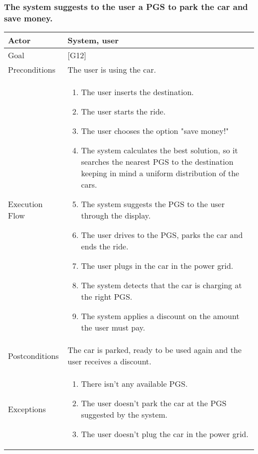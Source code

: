 \documentclass{article}
\begin{document}
	\subsubsection{The system suggests to the user a PGS to park the car and save money.}
	\begin{tabularx}{\textwidth}{  l  X  }
		\hline
		Actor & System, user\\
		\hline
		Goal & [G12]\\
		\hline
		Preconditions & The user is using the car.\\
		\hline
		Execution Flow & \begin{enumerate}
			\item{The user inserts the destination.}
                     \item{The user starts the ride.}
                     \item{The user chooses the option "save money!"}
										 \item{The system calculates the best solution, so it searches the nearest PGS to the destination keeping in mind a uniform distribution of the cars.}
										 \item{The system suggests the PGS to the user through the display.}
										 \item{The user drives to the PGS, parks the car and ends the ride.}
										 \item{The user plugs in the car in the power grid.}
										 \item{The system detects that the car is charging at the right PGS.}
										 \item{The system applies a discount on the amount the user must pay.}
										\end{enumerate}\\
		\hline
		Postconditions & The car is parked, ready to be used again and the user receives a discount.\\
		\hline
		Exceptions & \begin{enumerate}
				\item{There isn't any available PGS.}
				\item{The user doesn't park the car at the PGS suggested by the system.}
				\item{The user doesn't plug the car in the power grid.}
	\end{enumerate}\\
		\hline
	\end{tabularx}
\end{document}

